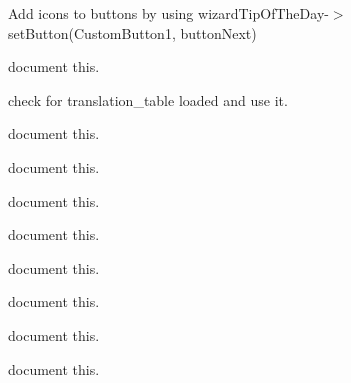 \begin{DoxyRefList}
\label{todo__todo000031}%
%
Add icons to buttons by using wizard\+Tip\+Of\+The\+Day-\/\texorpdfstring{$>$}{>}set\+Button(\+Custom\+Button1, button\+Next) 
\item[Member \mbox{\hyperlink{imgui__main_8c_ade3b9b5707149bbc7ebd77108a593cf3}{Tip\+Of\+The\+Day}} (void)]\label{todo__todo000184}%
%
document this.  
\item[Member \mbox{\hyperlink{imgui__main_8c_a84be33a7d31671fab1c88149df77a831}{translate}} (const char $\ast$string)]\label{todo__todo000078}%
%
check for translation\+\_\+table loaded and use it.  
\item[Member \mbox{\hyperlink{imgui__main_8c_adacf9e6c84ab5ba4079ab046784ad773}{triangle\+\_\+action}} (void)]\label{todo__todo000117}%
%
document this.  
\item[Member \mbox{\hyperlink{imgui__main_8c_ac2add86e93e670809a0836fef462d7b8}{undo\+\_\+action}} (void)]\label{todo__todo000118}%
%
document this.  
\item[Member \mbox{\hyperlink{imgui__main_8c_ad2b4c954bfa0e509c24c6da87532e771}{undo\+\_\+history\+\_\+viewer}} (void)]\label{todo__todo000010}%
%
document this.  
\item[Member \mbox{\hyperlink{imgui__main_8c_ade55590a3b7e8da115c7b1040da0a26e}{undo\+\_\+navigation}} (void)]\label{todo__todo000207}%
%
document this.  
\item[Member \mbox{\hyperlink{imgui__main_8c_a459ace9a6c614fe41b7f08ba91bc6dd4}{Undo\+History}} ]\label{todo__todo000002}%
%
document this.  
\item[Member \mbox{\hyperlink{imgui__main_8c_a4f0db1805b61395ac5131b6715853664}{update\+\_\+menu\+\_\+toolbar\+\_\+statusbar}} (void)]\label{todo__todo000203}%
%
document this.  
\item[Member \mbox{\hyperlink{imgui__main_8c_a0e5edf9912d0ddf2001d8b2dee57160f}{update\+All\+View\+Cross\+Hair\+Colors}} (unsigned int color)]\label{todo__todo000168}%
%
document this.  
\item[Member \mbox{\hyperlink{imgui__main_8c_a2d7aab5bd0ea8c76fa3632031226a84e}{update\+All\+View\+Grid\+Colors}} (unsigned int color)]\label{todo__todo000170}%
%
document this.  
\item[Member \mbox{\hyperlink{imgui__main_8c_aca4bc88b2a23d898c399d9b8cac93633}{update\+All\+Viewscrollbars}} (bool val)]\label{todo__todo000167}%

\end{DoxyRefList}
